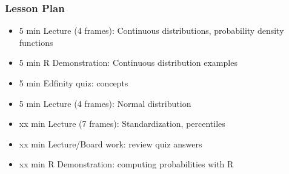 \begin{frame}
    \frametitle{Lesson Plan}
    \begin{itemize}
        \item 5 min Lecture (4 frames): Continuous distributions, probability density functions
        \item 5 min R Demonstration: Continuous distribution examples
        \item 5 min Edfinity quiz: concepts

        \item 5 min Lecture (4 frames): Normal distribution
        \item xx min Lecture (7 frames): Standardization, percentiles
        \item xx min Lecture/Board work: review quiz answers
        \item xx min R Demonstration: computing probabilities with R
        

    \end{itemize}
\end{frame}



